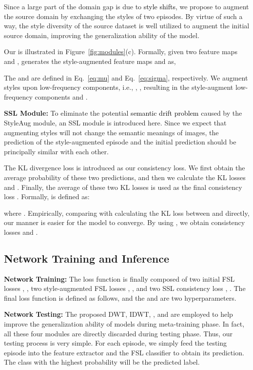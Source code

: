 \documentclass{article}
\newcommand{\fyq}{\textcolor{black}}
\begin{document}
	
	

Since a large part of the domain gap is due to \fyq{style shifts}, we propose to augment the source domain by exchanging the styles of two episodes. By virtue of such a way, the style diversity of the source dataset is well utilized to augment the initial source domain, improving the generalization ability of the model.

	
Our  is illustrated in Figure~\ref{fig:modules}(c). Formally, given two feature maps  and ,  generates the style-augmented feature maps  and  as, 
	
	
	
The  and  are defined in Eq.~\ref{eq:mu} and Eq.~\ref{eq:sigma}, respectively. We augment styles upon  low-frequency components, i.e., , , resulting in the style-augment low-frequency components  and .
	


\noindent \textbf{SSL Module:} 
To eliminate the potential \fyq{semantic drift problem} caused by the StyleAug module, 
an SSL module is introduced here. Since we expect that augmenting styles will not change the semantic meanings of images, the prediction of the style-augmented episode  and the initial prediction  should be principally similar with each other.



The KL divergence loss is introduced as our consistency loss. We first obtain the average probability  of these two predictions, and then we calculate the KL losses  and . Finally, the average of these two KL losses is used as the final consistency loss . Formally,  is defined as:

	
	where . Empirically, comparing with calculating the KL loss between  and  directly, our manner is easier for the model to converge.
	By using , we obtain consistency losses  and . 


	
\subsection{Network Training and Inference}


\noindent\textbf{Network Training:} The loss function is finally composed of two initial FSL losses , , two style-augmented FSL losses , , and two SSL consistency loss , . The final loss function  is defined as follows, and the  and  are two hyperparameters. 




\noindent \textbf{Network Testing:} The proposed DWT, IDWT, , and  are employed to help improve the generalization ability of models during meta-training phase. In fact, all these four modules are directly discarded during testing phase. Thus, our testing process is very simple. For each episode, we simply feed the testing episode into the feature extractor  and the FSL classifier  to obtain its prediction. The class with the highest probability will be the predicted label.
\end{document}
